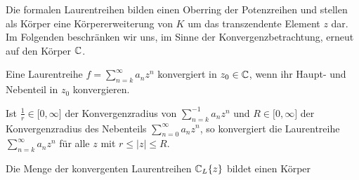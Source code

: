 %
Die formalen Laurentreihen bilden einen Oberring der Potenzreihen und stellen als Körper eine Körpererweiterung von $K$ um das transzendente Element $z$ dar.  %
%
%
%
%
% 
%
%
%
Im Folgenden beschränken wir uns, im Sinne der Konvergenzbetrachtung, erneut auf den Körper $\mathbb{C}$. 
%
\begin{defn}
Eine Laurentreihe $f = \sum_{n=k}^\infty a_n z^n$  konvergiert in $z_0 \in \mathbb{C}$, wenn ihr Haupt- und Nebenteil in $z_0$ konvergieren.
\end{defn}
%
%
\begin{bem}
Ist $\frac{1}{r} \in \lbrack 0,\infty\rbrack$ der Konvergenzradius von $\sum_{n=k}^{-1} a_{n}z^n$ und $R\in \lbrack 0,\infty\rbrack$ der Konvergenzradius des Nebenteils $\sum_{n=0}^{\infty} a_{n}z^n$, so konvergiert die Laurentreihe $\sum_{n=k}^\infty a_n z^n$ für alle $z$ mit $r \le |z| \le R$.
\end{bem} %
%
%
%
%
%
\begin{satz}
Die Menge der konvergenten Laurentreihen $\mathbb{C}_L\lbrace z\rbrace$ bildet einen Körper
\end{satz}
